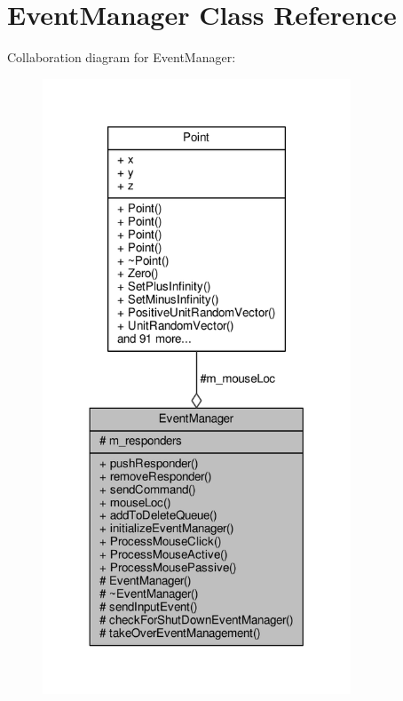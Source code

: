 \hypertarget{classEventManager}{}\section{Event\+Manager Class Reference}
\label{classEventManager}


Collaboration diagram for Event\+Manager\+:
\nopagebreak
\begin{figure}[H]
\begin{center}
\leavevmode
\includegraphics[width=260pt]{db/d78/classEventManager__coll__graph}
\end{center}
\end{figure}
